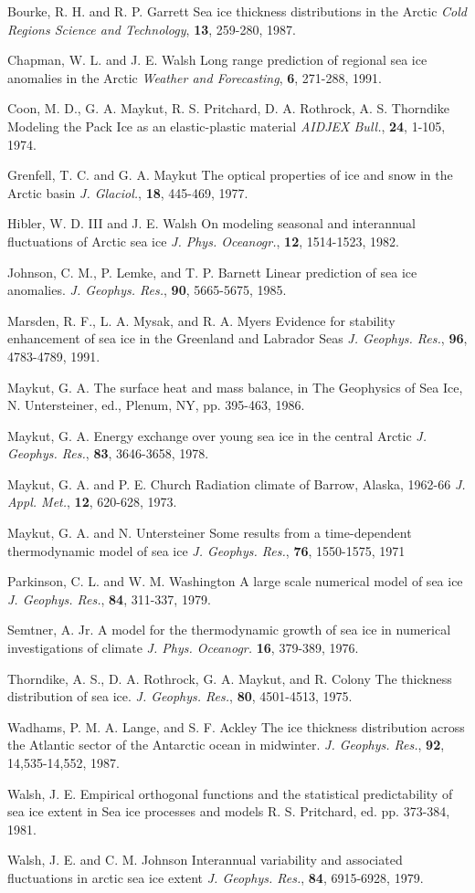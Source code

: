 Bourke, R. H. and R. P. Garrett  Sea ice thickness distributions in the
  Arctic {\it Cold Regions Science and Technology}, {\bf13}, 259-280, 1987.

Chapman, W. L. and J. E. Walsh  Long range prediction of regional sea 
  ice anomalies in the Arctic  {\it Weather and Forecasting},
  {\bf6}, 271-288, 1991.

Coon, M. D., G. A. Maykut, R. S. Pritchard, D. A. Rothrock, A. S. Thorndike
  Modeling the Pack Ice as an elastic-plastic material  {\it AIDJEX Bull.},
  {\bf24}, 1-105, 1974.

Grenfell, T. C. and G. A. Maykut  The optical properties of ice and 
  snow in the Arctic basin {\it J. Glaciol.}, {\bf18}, 445-469, 1977.

Hibler, W. D. III and J. E. Walsh  On modeling seasonal and interannual
  fluctuations of Arctic sea ice  {\it J. Phys. Oceanogr.}, 
  {\bf12}, 1514-1523, 1982.

Johnson, C. M., P. Lemke, and T. P. Barnett  Linear prediction of sea 
  ice anomalies. {\it J. Geophys. Res.}, {\bf90}, 5665-5675, 1985.

Marsden, R. F., L. A. Mysak, and R. A. Myers  Evidence for stability 
  enhancement of sea ice in the Greenland and Labrador Seas  
  {\it J. Geophys. Res.}, {\bf96}, 4783-4789, 1991.

Maykut, G. A.  The surface heat and mass balance, in The Geophysics of 
  Sea Ice, N. Untersteiner, ed., Plenum, NY, pp. 395-463, 1986.

Maykut, G. A.  Energy exchange over young sea ice in the central Arctic
  {\it J. Geophys. Res.}, {\bf83}, 3646-3658, 1978.

Maykut, G. A. and P. E. Church  Radiation climate of Barrow, Alaska, 1962-66
  {\it J. Appl. Met.}, {\bf12}, 620-628, 1973.

Maykut, G. A. and N. Untersteiner  Some results from a time-dependent 
  thermodynamic model of sea ice  {\it J. Geophys. Res.}, {\bf76}, 1550-1575, 1971

Parkinson, C. L. and W. M. Washington  A large scale numerical model
  of sea ice  {\it J. Geophys. Res.}, {\bf84}, 311-337, 1979.

Semtner, A. Jr.  A model for the thermodynamic growth of sea ice in 
  numerical investigations of climate  {\it J. Phys. Oceanogr.}
  {\bf16}, 379-389, 1976.

Thorndike, A. S., D. A. Rothrock, G. A. Maykut, and R. Colony  The thickness
distribution of sea ice.  {\it J. Geophys. Res.}, {\bf80}, 4501-4513, 1975.

Wadhams, P. M. A. Lange, and S. F. Ackley  The ice thickness distribution
across the Atlantic sector of the Antarctic ocean in midwinter.  
{\it J. Geophys. Res.}, {\bf92}, 14,535-14,552, 1987.

Walsh, J. E.  Empirical orthogonal functions and the statistical 
  predictability of sea ice extent  in Sea ice processes and models  
  R. S. Pritchard, ed.  pp. 373-384, 1981.

Walsh, J. E. and C. M. Johnson  Interannual variability and associated 
  fluctuations in arctic sea ice extent  {\it J. Geophys. Res.},
  {\bf84}, 6915-6928, 1979.
